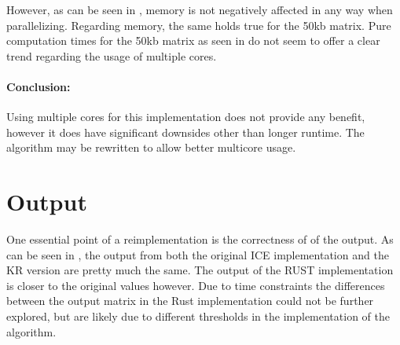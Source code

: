 


However, as can be seen in , memory is not negatively
affected in any way when parallelizing. Regarding memory, the same holds true for
the 50kb matrix. Pure computation times for the 50kb matrix as seen in
 do not seem to offer a clear trend regarding the usage of
multiple cores.


\paragraph{Conclusion:} Using multiple cores for this implementation does not
provide any benefit, however it does have significant downsides other than
longer runtime. The algorithm may be rewritten to allow better multicore usage.



\section{Output}



One essential point of a reimplementation is the correctness of of the output.
As can be seen in , the output from both the original ICE
implementation and the KR version are pretty much the same. The output of the
RUST implementation is closer to the original values however. Due to time
constraints the differences between the output matrix in the Rust implementation
could not be further explored, but are likely due to different thresholds in
the implementation of the algorithm.






